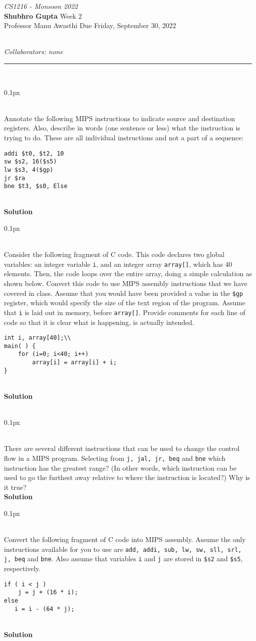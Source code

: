 \documentclass[11pt]{article}
\newcommand{\problem}[1]{\begin{adjustwidth}{0.1px}\noindent \framebox[1.2\width]{\large Problem #1}\end{adjustwidth} \bigskip\\}
\newcommand{\code}[1]{{\texttt{#1}}}
\newcommand{\lesgo}[5]{
\begin{large}
\emph{#1}\smallskip \\
\textbf{Shubhro Gupta} \hfill Week #2\smallskip \\
Professor #3 \hfill Due #4\\
\end{large} \medskip \\
{\emph{Collaborators: #5}}\\
\hrule
\vspace{50px}
\\
}
\begin{document}
\lesgo{CS1216 - Monsoon 2022}{2}{Manu Awasthi}{Friday, September 30, 2022}{none}

\problem{1}
Annotate the following MIPS instructions to indicate source and destination registers. Also, describe in words (one sentence or less) what the instruction is trying to do.  These are all individual instructions and not a part of a sequence:
\begin{lstlisting}[style=MIPS]
addi $t0, $t2, 10
sw $s2, 16($s5)
lw $s3, 4($gp)
jr $ra
bne $t3, $s0, Else
\end{lstlisting}
\bigskip \\
\textbf{Solution}\\


\newpage
\problem{2}
Consider the following fragment of C code. This code declares two global variables: an integer variable \code{i}, and an integer array \code{array[]}, which has 40 elements. Then, the code loops over the entire array, doing a simple calculation as shown below. Convert this code to use MIPS assembly instructions that we have covered in class. Assume that you would have been provided a value in the \code{\$gp} register, which would specify the size of the text region of the program. Assume that \code{i} is laid out in memory, before \code{array[]}. Provide comments for each line of code so that it is clear what is happening, is actually intended.
\begin{lstlisting}[style=c]
int i, array[40];\\
main( ) { 
	for (i=0; i<40; i++) 
    	array[i] = array[i] + i; 
} 
\end{lstlisting}
\bigskip \\
\textbf{Solution}\\\




\newpage
\problem{3}
There are several different instructions that can be used to change the control flow in a MIPS program. Selecting from \code{j, jal, jr, beq} and \code{bne} which instruction has the greatest range? (In other words, which instruction can be used to go the furthest away relative to where the instruction is located?) Why is it true?
\bigskip \\
\textbf{Solution}\\






\newpage
\problem{4}
Convert the following fragment of C code into MIPS assembly.  Assume the only instructions available for you to use are \code{add, addi, sub, lw, sw, sll, srl, j, beq} and \code{bne}. Also assume that variables \code{i} and \code{j} are stored in \code{\$s2} and \code{\$s5}, respectively.
\begin{lstlisting}[style=c]
if ( i < j ) 
    j = j + (16 * i);
else
   i = i - (64 * j); 
\end{lstlisting}
\bigskip \\
\textbf{Solution}\\
\end{document}
